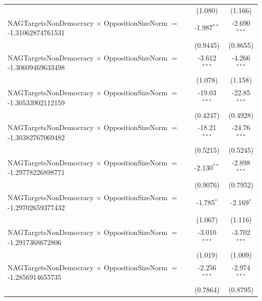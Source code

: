 \begin{tabular}{lcc}
                                                                                & (1.080)              & (1.166)\\   
   NAGTargetsNonDemocracy $\times$ OppositionSizeNorm $=$ -1.31062874761531     & -1.987$^{**}$        & -2.690$^{***}$\\   
                                                                                & (0.9445)             & (0.8655)\\   
   NAGTargetsNonDemocracy $\times$ OppositionSizeNorm $=$ -1.30609469633498     & -3.612$^{***}$       & -4.266$^{***}$\\   
                                                                                & (1.078)              & (1.158)\\   
   NAGTargetsNonDemocracy $\times$ OppositionSizeNorm $=$ -1.30533902112159     & -19.03$^{***}$       & -22.85$^{***}$\\   
                                                                                & (0.4247)             & (0.4928)\\   
   NAGTargetsNonDemocracy $\times$ OppositionSizeNorm $=$ -1.30382767069482     & -18.21$^{***}$       & -24.76$^{***}$\\   
                                                                                & (0.5215)             & (0.5245)\\   
   NAGTargetsNonDemocracy $\times$ OppositionSizeNorm $=$ -1.29778226898771     & -2.130$^{**}$        & -2.898$^{***}$\\   
                                                                                & (0.9076)             & (0.7952)\\   
   NAGTargetsNonDemocracy $\times$ OppositionSizeNorm $=$ -1.29702659377432     & -1.785$^{*}$         & -2.169$^{*}$\\   
                                                                                & (1.067)              & (1.116)\\   
   NAGTargetsNonDemocracy $\times$ OppositionSizeNorm $=$ -1.2917368672806      & -3.010$^{***}$       & -3.702$^{***}$\\   
                                                                                & (1.019)              & (1.009)\\   
   NAGTargetsNonDemocracy $\times$ OppositionSizeNorm $=$ -1.2856914655735      & -2.256$^{***}$       & -2.974$^{***}$\\   
                                                                                & (0.7864)             & (0.8795)\\   

\end{tabular}
